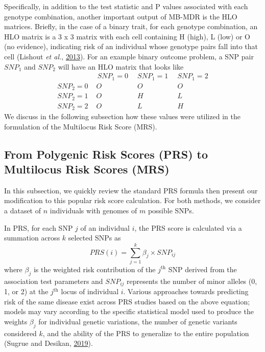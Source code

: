 \documentclass[a4paper,twoside, 9pt]{article}
\begin{document}
Specifically, in addition to the test statistic and P values associated with each
genotype combination, another important output of MB-MDR is the HLO
matrices. Briefly, in the case of a binary trait, for each genotype
combination, an HLO matrix is a 3 x 3 matrix with each cell containing H
(high), L (low) or O (no evidence), indicating risk of an individual
whose genotype pairs fall into that cell (Lishout \emph{et al.},
\protect\hyperlink{ref-S6nj6BFK}{2013}). For an example binary outcome
problem, a SNP pair \(SNP_1\) and \(SNP_2\) will have an HLO
matrix that looks like \[ \begin{array}{l|ccc}
& \, SNP_1 = 0 \,\,\,& SNP_1 = 1 \,\,\,& SNP_1 = 2   \\
\hline
SNP_2 = 0 \,\,& O        & O        & O \\
SNP_2 = 1 \,\,& O        & H        & L \\
SNP_2 = 2 \,\,& O        & L        & H
\end{array}
\] We discuss in the following subsection how these values were utilized
in the formulation of the Multilocus Risk Score (MRS).


\subsection{From Polygenic Risk Scores (PRS) to Multilocus Risk
Scores
(MRS)}\label{from-polygenic-risk-scores-prs-to-multilocus-risk-scores-mrs}

\noindent In this subsection, we quickly review the standard PRS formula then
present our modification to this popular risk score calculation. For
both methods, we consider a dataset of \(n\) individuals with genomes of
\(m\) possible SNPs.

In PRS, for each SNP \(j\) of an individual \(i\), the PRS score is
calculated via a summation across \(k\) selected SNPs as
\begin{equation}\label{eq1}
PRS(i)=\sum_{j=1}^{k} \beta_j \times SNP_{ij}
\end{equation}
where \(\beta_j\) is
the weighted risk contribution of the \(j^\textrm{th}\) SNP derived from
the association test parameters and \(SNP_{ij}\) represents the number
of minor alleles (0, 1, or 2) at the \(j^\textrm{th}\) locus of
individual \(i\). Various approaches towards predicting risk of the same
disease exist across PRS studies based on the above equation; models may
vary according to the specific statistical model used to produce the
weights \(\beta_j\) for individual genetic variations, the number of
genetic variants considered \(k\), and the ability of the PRS to
generalize to the entire population (Sugrue and Desikan,
\protect\hyperlink{ref-1Dlv3tAGh}{2019}).
\end{document}

